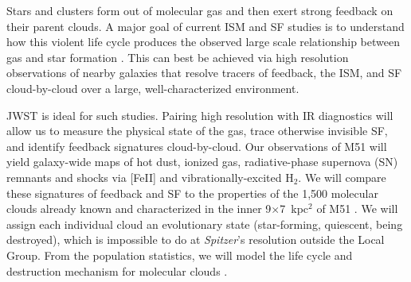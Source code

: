 \documentclass[12pt]{article}
\begin{document}

%

\vspace{-0.5\baselineskip}

\justification          %
\vspace{-0.1in}
 Stars and clusters form out of molecular gas and then exert strong feedback on their parent clouds. A major goal of current ISM and SF studies is to understand how this violent life cycle produces the observed large scale relationship between gas and star formation \citep[e.g.,][]{kennicutt2012}. This can best be achieved via high resolution observations of nearby galaxies that resolve tracers of feedback, the ISM, and SF cloud-by-cloud over a large, well-characterized environment.




JWST is ideal for such studies. Pairing high resolution with IR diagnostics will allow us to measure the physical state of the gas, trace otherwise invisible SF, and identify feedback signatures cloud-by-cloud. Our observations of M51 will yield galaxy-wide maps of hot dust, ionized gas, radiative-phase supernova (SN) remnants and shocks via [Fe{\small II}] \citep{alonso-herrero2003} and vibrationally-excited H$_2$. We will compare these signatures of feedback and SF to the properties of the 1,500 molecular clouds already known and characterized in the inner 9$\times$7~kpc$^{2}$ of M51 \citep{colombo2014}. We will assign each individual cloud an evolutionary state (star-forming, quiescent, being destroyed), which is impossible to do at {\em Spitzer}'s resolution outside the Local Group. From the population statistics, we will model the life cycle and destruction mechanism for molecular clouds \citep[e.g.,][]{corbelli2017}.
\end{document}
